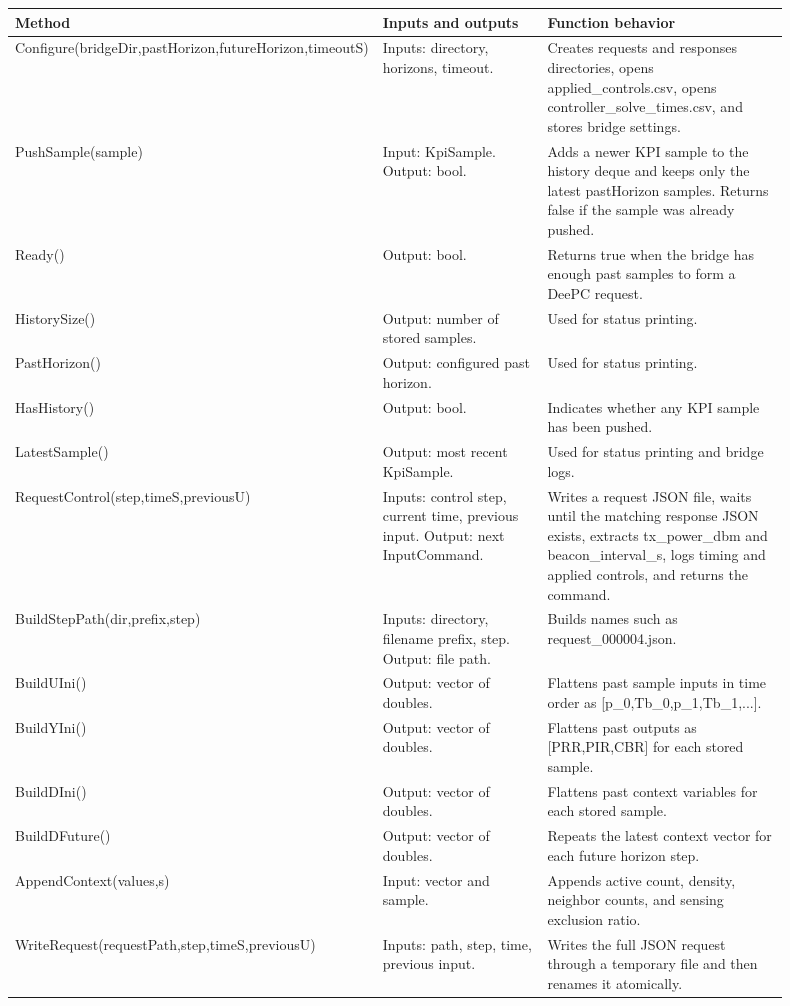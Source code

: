 \documentclass[11pt]{article}
\DeclareRobustCommand{\code}[1]{\texttt{\detokenize{#1}}}
\def\code#1{#1}%
\begin{document}
\begin{center}
\begin{longtable}{L{0.25\linewidth}L{0.27\linewidth}L{0.38\linewidth}}
\toprule
Method & Inputs and outputs & Function behavior \\
\midrule
\endhead
\code{Configure(bridgeDir,pastHorizon,futureHorizon,timeoutS)} &
Inputs: directory, horizons, timeout. &
Creates \code{requests} and \code{responses} directories, opens
\code{applied_controls.csv}, opens \code{controller_solve_times.csv}, and stores
bridge settings. \\
\code{PushSample(sample)} &
Input: \code{KpiSample}.  Output: bool. &
Adds a newer KPI sample to the history deque and keeps only the latest
\code{pastHorizon} samples.  Returns false if the sample was already pushed. \\
\code{Ready()} &
Output: bool. &
Returns true when the bridge has enough past samples to form a DeePC request. \\
\code{HistorySize()} &
Output: number of stored samples. &
Used for status printing. \\
\code{PastHorizon()} &
Output: configured past horizon. &
Used for status printing. \\
\code{HasHistory()} &
Output: bool. &
Indicates whether any KPI sample has been pushed. \\
\code{LatestSample()} &
Output: most recent \code{KpiSample}. &
Used for status printing and bridge logs. \\
\code{RequestControl(step,timeS,previousU)} &
Inputs: control step, current time, previous input.  Output: next
\code{InputCommand}. &
Writes a request JSON file, waits until the matching response JSON exists,
extracts \code{tx_power_dbm} and \code{beacon_interval_s}, logs timing and
applied controls, and returns the command. \\
\code{BuildStepPath(dir,prefix,step)} &
Inputs: directory, filename prefix, step.  Output: file path. &
Builds names such as \code{request_000004.json}. \\
\code{BuildUIni()} &
Output: vector of doubles. &
Flattens past sample inputs in time order as
\code{[p_0,Tb_0,p_1,Tb_1,...]}. \\
\code{BuildYIni()} &
Output: vector of doubles. &
Flattens past outputs as \code{[PRR,PIR,CBR]} for each stored sample. \\
\code{BuildDIni()} &
Output: vector of doubles. &
Flattens past context variables for each stored sample. \\
\code{BuildDFuture()} &
Output: vector of doubles. &
Repeats the latest context vector for each future horizon step. \\
\code{AppendContext(values,s)} &
Input: vector and sample. &
Appends active count, density, neighbor counts, and sensing exclusion ratio. \\
\code{WriteRequest(requestPath,step,timeS,previousU)} &
Inputs: path, step, time, previous input. &
Writes the full JSON request through a temporary file and then renames it
atomically. \\
\bottomrule
\end{longtable}
\end{center}
\end{document}
